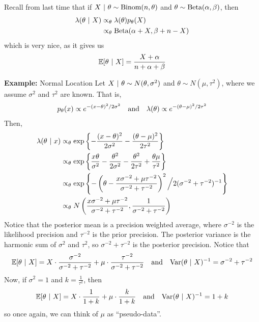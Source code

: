 
Recall from last time that if $X \given \theta \sim \Binom(n, \theta)$ and $\theta \sim \tt{Beta}(\alpha, \beta)$, then
\begin{align*}
    \lambda(\theta \given X) &\propto_{\theta} \lambda(\theta)p_{\theta}(X)\\
    &\propto_{\theta} \tt{Beta}(\alpha + X, \beta + n - X)
\end{align*}
which is very nice, as it gives us
\[ \bb{E}[\theta \given X] = \frac{X + \alpha}{n + \alpha + \beta} \]

\begin{example}{\textbf{Example:} Normal Location}
    Let $X \given \theta \sim N(\theta, \sigma^2)$ and $\theta \sim N(\mu, \tau^2)$, where we assume $\sigma^2$ and $\tau^2$ are known. That is,
    \[ p_{\theta}(x) \propto e^{-(x - \theta)^2/2\sigma^2} \quand \lambda(\theta) \propto e^{-(\theta - \mu)^2/2\tau^2} \]
    Then,
    \begin{align*}
        \lambda(\theta \given x) &\propto_{\theta} \exp\left\{-\frac{(x - \theta)^2}{2\sigma^2} - \frac{(\theta - \mu)^2}{2\tau^2}\right\}\\
        &\propto_{\theta} \exp\left\{\frac{x\theta}{\sigma^2} - \frac{\theta^2}{2\sigma^2} - \frac{\theta^2}{2\tau^2} + \frac{\theta\mu}{\tau^2}\right\}\\
        &\propto_{\theta} \exp\left\{-\left(\theta - \frac{x\sigma^{-2} + \mu\tau^{-2}}{\sigma^{-2} + \tau^{-2}}\right)^2 \Big/ 2(\sigma^{-2} + \tau^{-2})^{-1}\right\}\\
        &\propto_{\theta} N\left(\frac{x\sigma^{-2} + \mu\tau^{-2}}{\sigma^{-2} + \tau^{-2}}, \frac{1}{\sigma^{-2} + \tau^{-2}}\right)
    \end{align*}
    Notice that the posterior mean is a precision weighted average, where $\sigma^{-2}$ is the likelihood precision and $\tau^{-2}$ is the prior precision. The posterior variance is the harmonic sum of $\sigma^2$ and $\tau^2$, so $\sigma^{-2} + \tau^{-2}$ is the posterior precision. Notice that
    \[ \bb{E}[\theta \given X] = X \cdot \frac{\sigma^{-2}}{\sigma^{-2} + \tau^{-2}} + \mu \cdot \frac{\tau^{-2}}{\sigma^{-2} + \tau^{-2}} \quand \Var(\theta \given X)^{-1} = \sigma^{-2} + \tau^{-2} \]
    Now, if $\sigma^2 = 1$ and $k = \frac{1}{\tau^2}$, then
    \[ \bb{E}[\theta \given X] = X \cdot \frac{1}{1 + k} + \mu \cdot \frac{k}{1 + k} \quand \Var(\theta \given X)^{-1} = 1 + k \]
    so once again, we can think of $\mu$ as ``pseudo-data''.\\


\end{example}
